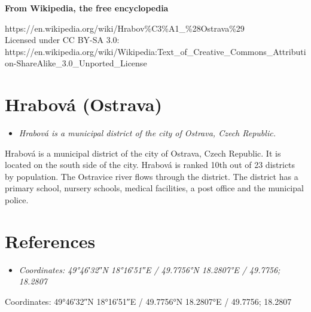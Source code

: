 \textbf{From Wikipedia, the free encyclopedia}

https://en.wikipedia.org/wiki/Hrabov\%C3\%A1\_\%28Ostrava\%29\\
Licensed under CC BY-SA 3.0:\\
https://en.wikipedia.org/wiki/Wikipedia:Text\_of\_Creative\_Commons\_Attribution-ShareAlike\_3.0\_Unported\_License

\section{Hrabová (Ostrava)}\label{hrabovuxe1-ostrava}

\begin{itemize}
\item
  \emph{Hrabová is a municipal district of the city of Ostrava, Czech
  Republic.}
\end{itemize}

Hrabová is a municipal district of the city of Ostrava, Czech Republic.
It is located on the south side of the city. Hrabová is ranked 10th out
of 23 districts by population. The Ostravice river flows through the
district. The district has a primary school, nursery schools, medical
facilities, a post office and the municipal police.

\section{References}\label{references}

\begin{itemize}
\item
  \emph{Coordinates: 49°46′32″N 18°16′51″E﻿ / ﻿49.7756°N 18.2807°E﻿ /
  49.7756; 18.2807}
\end{itemize}

Coordinates: 49°46′32″N 18°16′51″E﻿ / ﻿49.7756°N 18.2807°E﻿ / 49.7756;
18.2807
